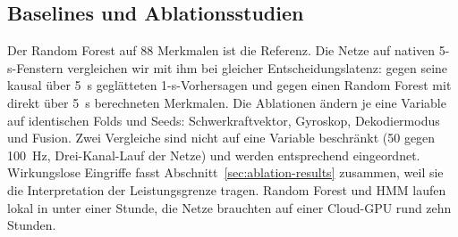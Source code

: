 \subsection{Baselines und Ablationsstudien}
\label{sec:ablations}

Der Random Forest auf 88 Merkmalen ist die Referenz. Die Netze auf nativen
5-s-Fenstern vergleichen wir mit ihm bei gleicher Entscheidungslatenz: gegen
seine kausal über 5~s geglätteten 1-s-Vorhersagen und gegen einen Random
Forest mit direkt über 5~s berechneten Merkmalen. Die Ablationen ändern je
eine Variable auf identischen Folds und Seeds: Schwerkraftvektor,
Gyroskop, Dekodiermodus und Fusion. Zwei Vergleiche sind nicht auf eine
Variable beschränkt (50 gegen 100~Hz, Drei-Kanal-Lauf der Netze) und werden
entsprechend eingeordnet. Wirkungslose Eingriffe fasst Abschnitt~\ref{sec:ablation-results} zusammen,
weil sie die Interpretation der Leistungsgrenze tragen. Random Forest und HMM
laufen lokal in unter einer Stunde, die Netze brauchten auf einer
Cloud-GPU rund zehn Stunden.
